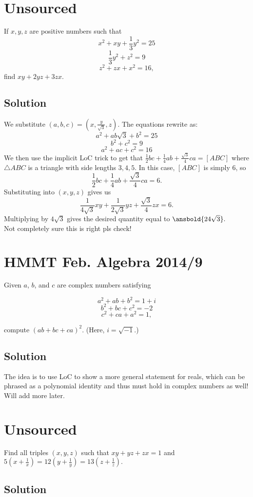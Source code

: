\documentclass{article}
\begin{document}
\pagebreak\section{Unsourced}
If $x,y,z$ are positive numbers such that
    \[x^2+xy+\frac{1}{3}y^2=25\]
    \[\frac{1}{3}y^2+z^2=9\]
    \[z^2+zx+x^2=16,\]
    find $xy+2yz+3zx.$

\subsection{Solution}
We substitute $(a,b,c)=(x,\frac{y}{\sqrt{3}},z)$. The equations rewrite as:
$$a^2+ab\sqrt{3}+b^2=25$$
$$b^2+c^2=9$$
$$a^2+ac+c^2=16$$
We then use the implicit LoC trick to get that $\frac{1}{2}bc+\frac{1}{4}ab+\frac{\sqrt{3}}{4}ca=[ABC]$ where $\triangle ABC$ is a triangle with side lengths $3,4,5$. In this case, $[ABC]$ is simply $6$, so $$\frac{1}{2}bc+\frac{1}{4}ab+\frac{\sqrt{3}}{4}ca=6.$$
Substituting into $(x,y,z)$ gives us $$\frac{1}{4\sqrt{3}}xy+\frac{1}{2\sqrt{3}}yz+\frac{\sqrt{3}}{4}zx=6.$$ Multiplying by $4\sqrt{3}$ gives the desired quantity equal to $\ansbold{24\sqrt{3}}.$\\
Not completely sure this is right pls check!

\pagebreak\section{HMMT Feb. Algebra 2014/9}
Given $a$, $b$, and $c$ are complex numbers satisfying

\[ a^2+ab+b^2=1+i \]
\[ b^2+bc+c^2=-2 \]
\[ c^2+ca+a^2=1, \]

compute $(ab+bc+ca)^2$. (Here, $i=\sqrt{-1}$.)

\subsection{Solution}
The idea is to use LoC to show a more general statement for reals, which can be phrased as a polynomial identity and thus must hold in complex numbers as well! Will add more later.

\pagebreak\section{Unsourced}
Find all triples $(x,y,z)$ such that $xy+yz+zx=1$ and $5(x+\frac{1}{x})=12(y+\frac{1}{y})=13(z+\frac{1}{z}).$

\subsection{Solution}
\end{document}
